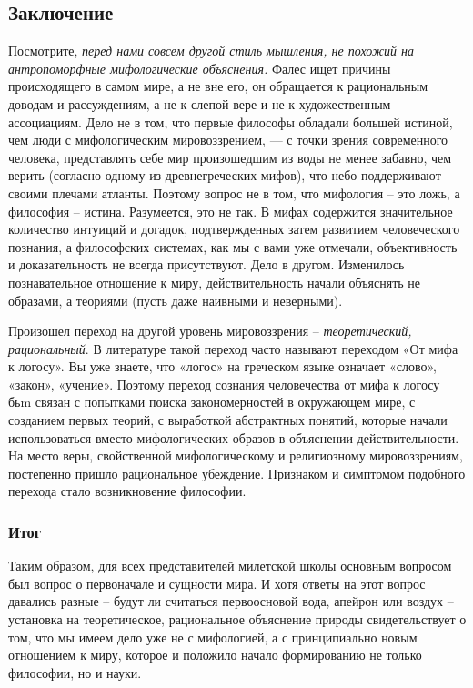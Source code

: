 \documentclass[a4paper, 14pt]{extreport}
\begin{document}
\subsection{Заключение}

Посмотрите, \emph{перед нами совсем другой стиль мышления, не похожий на
антропоморфные мифологические объяснения.} Фалес ищет причины
происходящего в самом мире, а не вне его, он обращается к рациональным
доводам и рассуждениям, а не к слепой вере и не к художественным
ассоциациям. Дело не в том, что первые философы обладали большей
истиной, чем люди с мифологическим мировоззрением, --- с точки зрения
современного человека, представлять себе мир произошедшим из воды не
менее забавно, чем верить (согласно одному из древнегреческих мифов),
что небо поддерживают своими плечами атланты. Поэтому вопрос не в том,
что мифология -- это ложь, а философия -- истина. Разумеется, это не
так. В мифах содержится значительное количество интуиций и догадок,
подтвержденных затем развитием человеческого познания, а философских
системах, как мы с вами уже отмечали, объективность и доказательность не
всегда присутствуют. Дело в другом. Изменилось познавательное отношение
к миру, действительность начали объяснять не образами, а теориями (пусть
даже наивными и неверными).

Произошел переход на другой уровень мировоззрения --
\emph{теоретический, рациональный}. В литературе такой переход часто
называют переходом «От мифа к логосу». Вы уже знаете, что «логос» на
греческом языке означает «слово», «закон», «учение». Поэтому переход
сознания человечества от мифа к логосу бьm связан с попытками поиска
закономерностей в окружающем мире, с созданием первых теорий, с
выработкой абстрактных понятий, которые начали использоваться вместо
мифологических образов в объяснении действительности. На место веры,
свойственной мифологическому и религиозному мировоззрениям, постепенно
пришло рациональное убеждение. Признаком и симптомом подобного перехода
стало возникновение философии.

\subsubsection{Итог}

Таким образом, для всех представителей милетской школы основным вопросом
был вопрос о первоначале и сущности мира. И хотя ответы на этот вопрос
давались разные -- будут ли считаться первоосновой вода, апейрон или
воздух -- установка на теоретическое, рациональное объяснение природы
свидетельствует о том, что мы имеем дело уже не с мифологией, а с
принципиально новым отношением к миру, которое и положило начало
формированию не только философии, но и науки.
\end{document}
